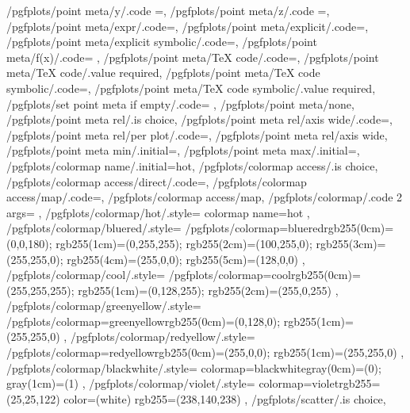 {	/pgfplots/point meta/y/.code	={},%
	/pgfplots/point meta/z/.code	={},%
	/pgfplots/point meta/expr/.code={},%
	/pgfplots/point meta/explicit/.code={},%
	/pgfplots/point meta/explicit symbolic/.code={},%
	/pgfplots/point meta/f(x)/.code={
		\ifpgfplots@curplot@threedim
		\else
		\fi
	},
	/pgfplots/point meta/TeX code/.code={},%
	/pgfplots/point meta/TeX code/.value required,
	/pgfplots/point meta/TeX code symbolic/.code={},%
	/pgfplots/point meta/TeX code symbolic/.value required,
	/pgfplots/set point meta if empty/.code={%
		\ifx\pgfplotspointmetainputhandler\pgfutil@empty
		\fi
	},%
	/pgfplots/point meta/none,
	/pgfplots/point meta rel/.is choice,
	/pgfplots/point meta rel/axis wide/.code={\def\pgfplots@perpointmeta@rel@choice{0}},%
	/pgfplots/point meta rel/per plot/.code={\def\pgfplots@perpointmeta@rel@choice{1}},%
	/pgfplots/point meta rel/axis wide,%
	/pgfplots/point meta min/.initial=,%
	/pgfplots/point meta max/.initial=,%
	/pgfplots/colormap name/.initial=hot,
	/pgfplots/colormap access/.is choice,
	/pgfplots/colormap access/direct/.code={\def\pgfplots@colormap@access{d}},%
	/pgfplots/colormap access/map/.code={\def\pgfplots@colormap@access{m}},%
	/pgfplots/colormap access/map,%
	/pgfplots/colormap/.code 2 args={%
	},
	/pgfplots/colormap/hot/.style={
		colormap name=hot
	},
	/pgfplots/colormap/bluered/.style={
		/pgfplots/colormap={bluered}{rgb255(0cm)=(0,0,180); rgb255(1cm)=(0,255,255); rgb255(2cm)=(100,255,0); rgb255(3cm)=(255,255,0); rgb255(4cm)=(255,0,0); rgb255(5cm)=(128,0,0)}
	},
	/pgfplots/colormap/cool/.style={
		/pgfplots/colormap={cool}{rgb255(0cm)=(255,255,255); rgb255(1cm)=(0,128,255); rgb255(2cm)=(255,0,255)}
	},
	/pgfplots/colormap/greenyellow/.style={
		/pgfplots/colormap={greenyellow}{rgb255(0cm)=(0,128,0); rgb255(1cm)=(255,255,0)}
	},
	/pgfplots/colormap/redyellow/.style={
		/pgfplots/colormap={redyellow}{rgb255(0cm)=(255,0,0); rgb255(1cm)=(255,255,0)}
	},
	/pgfplots/colormap/blackwhite/.style={
		colormap={blackwhite}{gray(0cm)=(0); gray(1cm)=(1)}
	},
	/pgfplots/colormap/violet/.style={
		colormap={violet}{rgb255=(25,25,122) color=(white) rgb255=(238,140,238)}
	},
	/pgfplots/scatter/.is choice,
}
